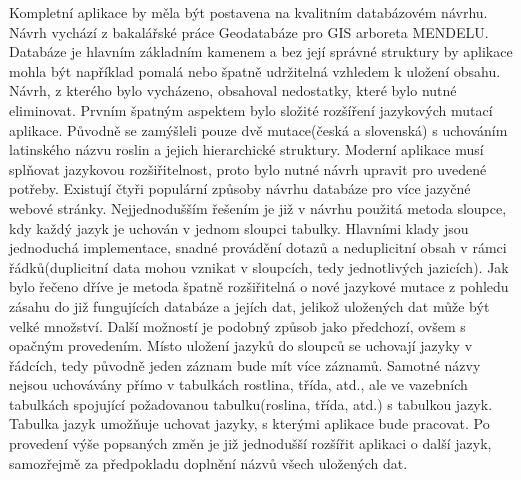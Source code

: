 \documentclass[12pt]{article}%
\begin{document}
{{%
Kompletní aplikace by měla být postavena na kvalitním databázovém návrhu. Návrh vychází 
z bakalářské práce Geodatabáze pro GIS arboreta MENDELU. Databáze je hlavním základním 
kamenem a bez její správné struktury by aplikace mohla být například pomalá nebo špatně udržitelná 
vzhledem k uložení obsahu. Návrh, z kterého bylo vycházeno, obsahoval nedostatky, které bylo 
nutné eliminovat. Prvním špatným aspektem bylo složité rozšíření jazykových mutací aplikace. 
Původně se zamýšleli pouze dvě mutace(česká a slovenská) s uchováním latinského názvu roslin 
a jejich hierarchické struktury. Moderní aplikace musí splňovat jazykovou rozšiřitelnost, proto 
bylo nutné návrh upravit pro uvedené potřeby. Existují čtyři populární způsoby návrhu databáze 
pro více jazyčné webové stránky. Nejjednodušším řešením je již v návrhu použitá metoda sloupce, 
kdy každý jazyk je uchován v jednom sloupci tabulky. Hlavními klady jsou jednoduchá implementace, 
snadné provádění dotazů a neduplicitní obsah v rámci řádků(duplicitní data mohou vznikat 
v sloupcích, tedy jednotlivých jazicích). Jak bylo řečeno dříve je metoda špatně rozšiřitelná 
o nové jazykové mutace z pohledu zásahu do již fungujících databáze a jejích dat, jelikož uložených
dat může být velké množství. Další možností je podobný způsob jako předchozí, ovšem s opačným 
provedením. Místo uložení jazyků do sloupců se uchovají jazyky v řádcích, tedy původně jeden záznam 
bude mít více záznamů.
Samotné názvy nejsou uchovávány přímo v tabulkách 
rostlina, třída, atd., ale ve vazebních tabulkách spojující požadovanou tabulku(roslina, třída, 
atd.) s tabulkou jazyk. Tabulka jazyk umožňuje uchovat jazyky, s kterými aplikace bude pracovat. 
Po provedení výše popsaných změn je již jednodušší rozšířit aplikaci o další jazyk, samozřejmě 
za předpokladu doplnění názvů všech uložených dat.

}}
\end{document}
